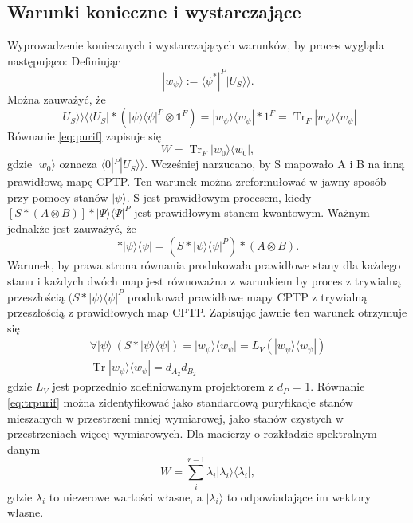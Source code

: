 \documentclass[10pt]{article} %
\DeclareMathOperator{\Trs}{Tr}
\newcommand{\Ket}[1]{|#1\rangle}
\newcommand{\Bra}[1]{\langle#1|}
\newcommand{\BBra}[1]{\langle\langle#1|}
\newcommand{\KKet}[1]{|#1\rangle\rangle}
\newcommand{\KP}{\Ket{\psi}}
\newcommand{\BP}{\Bra{\psi}}
\newcommand{\I}{\mathbb{1}}
\begin{document}
\subsection{Warunki konieczne i wystarczające}
Wyprowadzenie koniecznych i wystarczających warunków, by proces wygląda następująco:
Definiując
\begin{equation}
\label{eq:purif}
\Ket{w_\psi}:= \Bra{\psi^*}^P \KKet{U_S}.
\end{equation}
Można zauważyć, że
\begin{equation}
\KKet{U_S} \BBra{U_S} * (\Ket{\psi}\Bra{\psi}^P \otimes \I^F) = \Ket{w_\psi} \Bra{w_\psi} * 1^F = \Trs_F \Ket{w_\psi} \Bra{w_\psi}
\end{equation}
Równanie \eqref{eq:purif} zapisuje się
\begin{equation}
\label{eq:trpurif}
W = \Trs_F \Ket{w_0}\Bra{w_0},
\end{equation}
gdzie $\Ket{w_0}$ oznacza $\Bra{0}^P\KKet{U_S}$.
Wcześniej narzucano, by S mapowało A i B na inną prawidłową mapę CPTP.
Ten warunek można zreformułować w jawny sposób przy pomocy stanów $\Ket{\psi}$.
S jest prawidłowym procesem, kiedy $[ S * (A \otimes B)] * \Ket{\Psi}\Bra{\Psi}^P$ jest prawidłowym stanem kwantowym.
Ważnym jednakże jest zauważyć, że
\begin{equation}
[S * (A \otimes B)] * \Ket{\psi}\Bra{\psi} = (S * \KP \BP^P) * (A \otimes B).
\end{equation}
Warunek, by prawa strona równania produkowała prawidłowe stany dla każdego stanu i każdych dwóch map jest równoważna z warunkiem 
by proces z trywialną przeszłością $(S*\Ket{\psi}\Bra{\psi}^P$ produkował prawidłowe mapy CPTP z trywialną przeszłością z prawidłowych map CPTP.
Zapisując jawnie ten warunek otrzymuje się
\begin{gather}
\forall \Ket{\psi} ~(S * \KP \BP) = \Ket{w_\psi}\Bra{w_\psi} = L_V(\Ket{w_\psi}\Bra{w_\psi}) \nonumber \\
\label{eq:purifproj}
 \Trs \Ket{w_\psi} \Bra{w_\psi} = d_{A_2}d_{B_2}
\end{gather}
gdzie $L_V$ jest poprzednio zdefiniowanym projektorem z $d_P$ = 1.
Równanie \eqref{eq:trpurif} można zidentyfikować jako standardową puryfikacje stanów mieszanych w przestrzeni mniej wymiarowej, jako stanów
czystych w przestrzeniach więcej wymiarowych. Dla macierzy o rozkładzie spektralnym danym
\begin{equation}
W = \sum^{r-1}_i \lambda_i \Ket{\lambda_i}\Bra{\lambda_i},
\end{equation}
gdzie $\lambda_i$ to niezerowe wartości własne, a $\Ket{\lambda_i}$ to odpowiadające im wektory własne.
\end{document}
